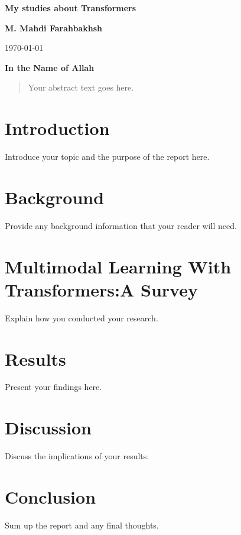 \documentclass{article}
\begin{document}
	
	\begin{titlepage}
		
		\centering
		\vspace*{2cm}
		\textbf{\LARGE My studies about Transformers}
		\vspace{1cm}
		

		
		\vfill
		
		\textbf{M. Mahdi Farahbakhsh}
		
		\vspace{1cm}
		\today
	\end{titlepage}
	
	\begin{center}
		\textbf{In the Name of Allah}
	\end{center}
	\begin{abstract}
		Your abstract text goes here.
	\end{abstract}
	
	\section{Introduction}
	Introduce your topic and the purpose of the report here.
	
	\section{Background}
	Provide any background information that your reader will need.
	
	\section{Multimodal Learning With Transformers:A Survey \cite{Multimodal_survey}}
	
	Explain how you conducted your research.
	
	\section{Results}
	Present your findings here.
	
	\section{Discussion}
	Discuss the implications of your results.
	
	\section{Conclusion}
	Sum up the report and any final thoughts.
	
	
	
	
	
\end{document}
